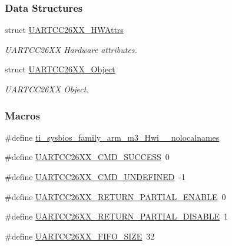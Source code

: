 \subsubsection*{Data Structures}
\begin{DoxyCompactItemize}
\item 
struct \hyperlink{struct_u_a_r_t_c_c26_x_x___h_w_attrs}{U\-A\-R\-T\-C\-C26\-X\-X\-\_\-\-H\-W\-Attrs}
\begin{DoxyCompactList}\small\item\em U\-A\-R\-T\-C\-C26\-X\-X Hardware attributes. \end{DoxyCompactList}\item 
struct \hyperlink{struct_u_a_r_t_c_c26_x_x___object}{U\-A\-R\-T\-C\-C26\-X\-X\-\_\-\-Object}
\begin{DoxyCompactList}\small\item\em U\-A\-R\-T\-C\-C26\-X\-X Object. \end{DoxyCompactList}\end{DoxyCompactItemize}
\subsubsection*{Macros}
\begin{DoxyCompactItemize}
\item 
\#define \hyperlink{_u_a_r_t_c_c26_x_x_8h_aaa17ecf48f5762e2e1bdb0bab8aacf0c}{ti\-\_\-sysbios\-\_\-family\-\_\-arm\-\_\-m3\-\_\-\-Hwi\-\_\-\-\_\-nolocalnames}
\item 
\#define \hyperlink{_u_a_r_t_c_c26_x_x_8h_ad64216306da8b74a54f2a456b5e34bbc}{U\-A\-R\-T\-C\-C26\-X\-X\-\_\-\-C\-M\-D\-\_\-\-S\-U\-C\-C\-E\-S\-S}~0
\item 
\#define \hyperlink{_u_a_r_t_c_c26_x_x_8h_aaffa29c3796e863da8131817bf9e735c}{U\-A\-R\-T\-C\-C26\-X\-X\-\_\-\-C\-M\-D\-\_\-\-U\-N\-D\-E\-F\-I\-N\-E\-D}~-\/1
\item 
\#define \hyperlink{_u_a_r_t_c_c26_x_x_8h_a681da30c89054d687603b864792894f7}{U\-A\-R\-T\-C\-C26\-X\-X\-\_\-\-R\-E\-T\-U\-R\-N\-\_\-\-P\-A\-R\-T\-I\-A\-L\-\_\-\-E\-N\-A\-B\-L\-E}~0
\item 
\#define \hyperlink{_u_a_r_t_c_c26_x_x_8h_a973b0815d1f88dc3f3e7191625783b99}{U\-A\-R\-T\-C\-C26\-X\-X\-\_\-\-R\-E\-T\-U\-R\-N\-\_\-\-P\-A\-R\-T\-I\-A\-L\-\_\-\-D\-I\-S\-A\-B\-L\-E}~1
\item 
\#define \hyperlink{_u_a_r_t_c_c26_x_x_8h_aa3cbdad922e595319c76870add0d41e6}{U\-A\-R\-T\-C\-C26\-X\-X\-\_\-\-F\-I\-F\-O\-\_\-\-S\-I\-Z\-E}~32
\end{DoxyCompactItemize}
